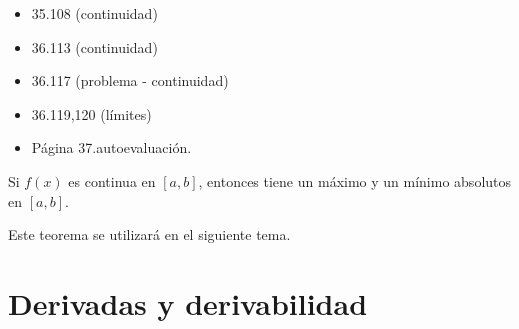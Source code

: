 \begin{problem}
\begin{itemize}
	\item 35.108 (continuidad)
	\item 36.113 (continuidad)
	\item 36.117 (problema - continuidad)
	\item 36.119,120 (límites)
	\item Página 37.autoevaluación.
\end{itemize}
\solution
\end{problem}

\begin{theorem}
Si $f(x)$ es continua en $[a,b]$, entonces tiene un máximo y un mínimo absolutos en $[a,b]$.
\end{theorem}

\obs Este teorema se utilizará en el siguiente tema.



\newpage\section{Derivadas y derivabilidad}

